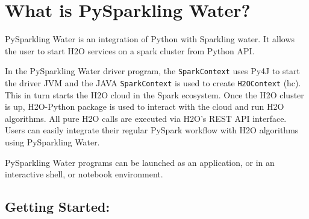 \section{What is PySparkling Water?}

PySparkling Water is an integration of Python with Sparkling water. It allows the user to start H2O services on a spark cluster from Python API.

In the PySparkling Water driver program, the \texttt{SparkContext} uses Py4J to start the driver JVM and the JAVA \texttt{SparkContext} is used to create \texttt{H2OContext} (hc). This in turn starts the H2O cloud in the Spark ecosystem. Once the H2O cluster is up, H2O-Python package is used to interact with the cloud and run H2O algorithms. All pure H2O calls are executed via H2O's REST API interface. Users can easily integrate their regular PySpark workflow with H2O algorithms using PySparkling Water.

PySparkling Water programs can be launched as an application, or in an interactive shell, or notebook environment.

\subsection{Getting Started:}

